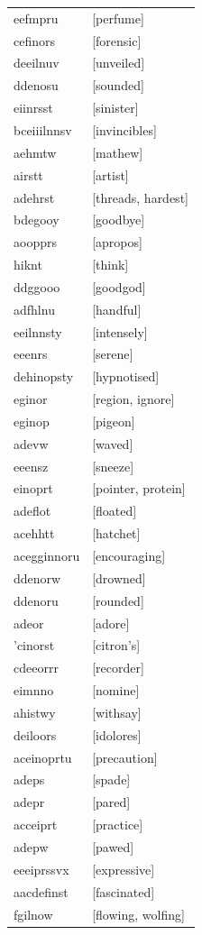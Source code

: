 \documentclass{article}
\begin{document}
\begin{tabular}{ll}
eefmpru & [perfume] \\
cefinors & [forensic] \\
deeilnuv & [unveiled] \\
ddenosu & [sounded] \\
eiinrsst & [sinister] \\
bceiiilnnsv & [invincibles] \\
aehmtw & [mathew] \\
airstt & [artist] \\
adehrst & [threads, hardest] \\
bdegooy & [goodbye] \\
aoopprs & [apropos] \\
hiknt & [think] \\
ddggooo & [goodgod] \\
adfhlnu & [handful] \\
eeilnnsty & [intensely] \\
eeenrs & [serene] \\
dehinopsty & [hypnotised] \\
eginor & [region, ignore] \\
eginop & [pigeon] \\
adevw & [waved] \\
eeensz & [sneeze] \\
einoprt & [pointer, protein] \\
adeflot & [floated] \\
acehhtt & [hatchet] \\
acegginnoru & [encouraging] \\
ddenorw & [drowned] \\
ddenoru & [rounded] \\
adeor & [adore] \\
'cinorst & [citron's] \\
cdeeorrr & [recorder] \\
eimnno & [nomine] \\
ahistwy & [withsay] \\
deiloors & [idolores] \\
aceinoprtu & [precaution] \\
adeps & [spade] \\
adepr & [pared] \\
acceiprt & [practice] \\
adepw & [pawed] \\
eeeiprssvx & [expressive] \\
aacdefinst & [fascinated] \\
fgilnow & [flowing, wolfing] \\

\end{tabular}
\end{document}
